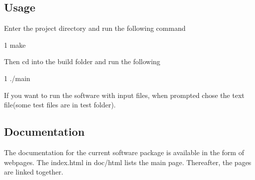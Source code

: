 \subsection*{Usage}

Enter the project directory and run the following command 
\begin{DoxyCode}
1 make
\end{DoxyCode}
 Then cd into the build folder and run the following 
\begin{DoxyCode}
1 ./main
\end{DoxyCode}
 If you want to run the software with input files, when prompted chose the text file(some test files are in test folder).

\subsection*{Documentation}

The documentation for the current software package is available in the form of webpages. The index.\+html in doc/html lists the main page. Thereafter, the pages are linked together. 